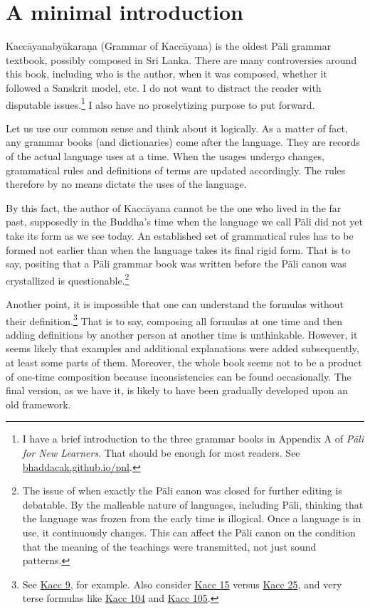 \cleardoublepage
{}
{}
\chapter*{A minimal introduction}

Kaccāyanabyākaraṇa (Grammar of Kaccāyana) is the oldest Pāli grammar textbook, possibly composed in Sri Lanka. There are many controversies around this book, including who is the author, when it was composed, whether it followed a Sanskrit model, etc. I do not want to distract the reader with disputable issues.\footnote{I have a brief introduction to the three grammar books in Appendix A of \emph{Pāli for New Learners}. That should be enough for most readers. See \url{bhaddacak.github.io/pnl}.} I also have no proselytizing purpose to put forward.

Let us use our common sense and think about it logically. As a matter of fact, any grammar books (and dictionaries) come after the language. They are records of the actual language uses at a time. When the usages undergo changes, grammatical rules and definitions of terms are updated accordingly. The rules therefore by no means dictate the uses of the language.

By this fact, the author of Kaccāyana cannot be the one who lived in the far past, supposedly in the Buddha's time when the language we call Pāli did not yet take its form as we see today. An established set of grammatical rules has to be formed not earlier than when the language takes its final rigid form. That is to say, positing that a Pāli grammar book was written before the Pāli canon was crystallized is questionable.\footnote{The issue of when exactly the Pāli canon was closed for further editing is debatable. By the malleable nature of languages, including Pāli, thinking that the language was frozen from the early time is illogical. Once a language is in use, it continuously changes. This can affect the Pāli canon on the condition that the meaning of the teachings were transmitted, not just sound patterns.}

Another point, it is impossible that one can understand the formulas without their definition.\footnote{See \hyperref[sut:9]{Kacc 9}, for example. Also consider \hyperref[sut:15]{Kacc 15} versus \hyperref[sut:25]{Kacc 25}, and very terse formulas like \hyperref[sut:104]{Kacc 104} and \hyperref[sut:105]{Kacc 105}.} That is to say, composing all formulas at one time and then adding definitions by another person at another time is unthinkable. However, it seems likely that examples and additional explanations were added subsequently, at least some parts of them. Moreover, the whole book seems not to be a product of one-time composition because inconsistencies can be found occasionally. The final version, as we have it, is likely to have been gradually developed upon an old framework.

